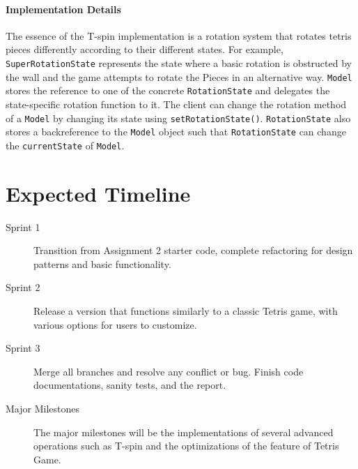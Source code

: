 \documentclass{article}
\begin{document}
\paragraph{Implementation Details}

The essence of the T-spin implementation is a rotation system that rotates tetris pieces differently according to their different states. For example, \verb`SuperRotationState` represents the state where a basic rotation is obstructed by the wall and the game attempts to rotate the Pieces in an alternative way. \verb`Model` stores the reference to one of the concrete \verb`RotationState` and delegates the state-specific rotation function to it. The client can change the rotation method of a \verb|Model| by changing its state using \verb`setRotationState()`. \verb`RotationState` also stores a backreference to the \verb`Model` object such that \verb`RotationState` can change the \verb`currentState` of \verb`Model`.

\clearpage

\section{Expected Timeline}

\begin{description}
\item[Sprint 1] Transition from Assignment 2 starter code, complete refactoring for design patterns and basic functionality.
\item[Sprint 2] Release a version that functions similarly to a classic Tetris game, with various options for users to customize.
\item[Sprint 3] Merge all branches and resolve any conflict or bug. Finish code documentations, sanity tests, and the report.
\item[Major Milestones] The major milestones will be the implementations of several advanced operations such as T-spin and the optimizations of the feature of Tetris Game.
\end{description}

\begin{figure}[H]
    
\end{figure}
\end{document}
